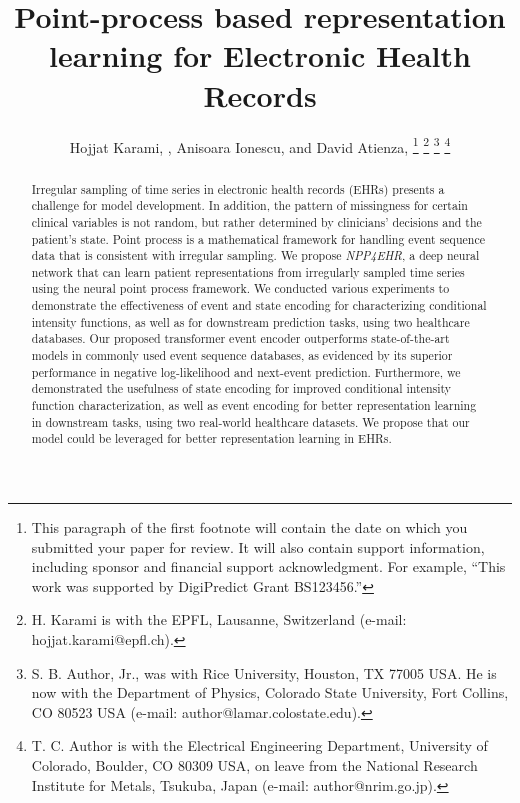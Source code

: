 \documentclass[journal,twoside,web]{ieeecolor}
\begin{document}
\title{Point-process based representation learning for Electronic Health Records}
\author{Hojjat Karami, , Anisoara Ionescu, and David Atienza, 
\thanks{This paragraph of the first footnote will contain the date on 
which you submitted your paper for review. It will also contain support 
information, including sponsor and financial support acknowledgment. For 
example, ``This work was supported by DigiPredict Grant BS123456.'' }
\thanks{H. Karami is with the EPFL, Lausanne, Switzerland (e-mail: hojjat.karami@epfl.ch). }
\thanks{S. B. Author, Jr., was with Rice University, Houston, TX 77005 USA. He is 
now with the Department of Physics, Colorado State University, Fort Collins, 
CO 80523 USA (e-mail: author@lamar.colostate.edu).}
\thanks{T. C. Author is with 
the Electrical Engineering Department, University of Colorado, Boulder, CO 
80309 USA, on leave from the National Research Institute for Metals, 
Tsukuba, Japan (e-mail: author@nrim.go.jp).}}

\maketitle


\begin{abstract}

    Irregular sampling of time series in electronic health records (EHRs) presents a challenge for model development. In addition, the pattern of missingness for certain clinical variables is not random, but rather determined by clinicians' decisions and the patient's state. 
Point process is a mathematical framework for handling event sequence data that is consistent with irregular sampling. 
We propose \emph{NPP4EHR}, a deep neural network that can learn patient representations from irregularly sampled time series using the neural point process framework. We conducted various experiments to demonstrate the effectiveness of event and state encoding for characterizing conditional intensity functions, as well as for downstream prediction tasks, using two healthcare databases. 
Our proposed transformer event encoder outperforms state-of-the-art models in commonly used event sequence databases, as evidenced by its superior performance in negative log-likelihood and next-event prediction. Furthermore, we demonstrated the usefulness of state encoding for improved conditional intensity function characterization, as well as event encoding for better representation learning in downstream tasks, using two real-world healthcare datasets.
We propose that our model could be leveraged for better representation learning in EHRs.

\end{abstract}
\end{document}
